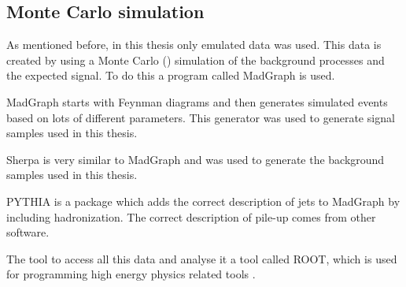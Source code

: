 \subsection{Monte Carlo simulation}
As mentioned before, in this thesis only emulated data was used. This data is created by using a Monte Carlo (\abbrMC) simulation of the background processes and the expected signal. To do this a program called MadGraph is used.

MadGraph \citep{madgraph} starts with Feynman diagrams and then generates simulated events based on lots of different parameters. This generator was used to generate signal samples used in this thesis. 

Sherpa \citep{sherpa} is very similar to MadGraph and was used to generate the background samples used in this thesis.

PYTHIA \citep{Sjostrand:2008} is a package which adds the correct description of jets to MadGraph by including hadronization. The correct description of pile-up comes from other \abbrATLAS software.

The tool to access all this data and analyse it a tool called ROOT, which is used for programming high energy physics related tools \citep{root}.